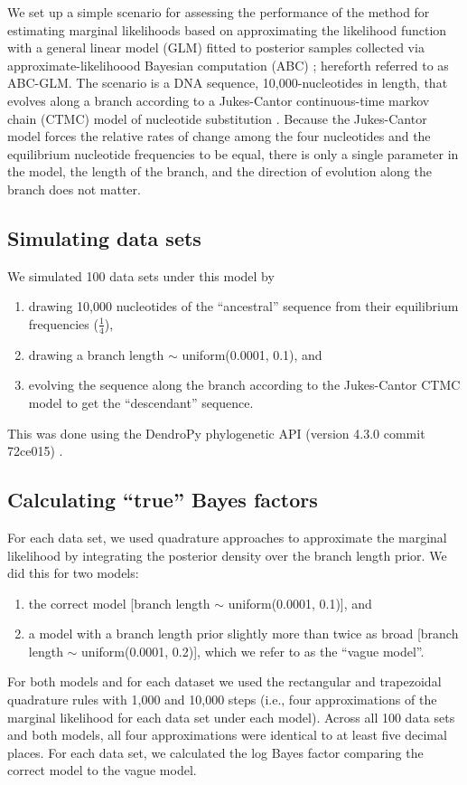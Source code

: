We set up a simple scenario for assessing the performance of the method for
estimating marginal likelihoods based on approximating the likelihood function
with a general linear model (GLM) fitted to posterior samples collected via
approximate-likelihoood Bayesian computation (ABC) \citep{Leuenberger2010};
hereforth referred to as ABC-GLM.
The scenario is a DNA sequence, 10,000-nucleotides in length, that evolves
along a branch according to a Jukes-Cantor continuous-time markov chain (CTMC)
model of nucleotide substitution \citep{JC1969}.
Because the Jukes-Cantor model forces the relative rates of change among the
four nucleotides and the equilibrium nucleotide frequencies to be equal, there
is only a single parameter in the model, the length of the branch, and the
direction of evolution along the branch does not matter.

\subsection{Simulating data sets}
We simulated 100 data sets under this model by
\begin{enumerate}
    \item drawing 10,000 nucleotides of the ``ancestral'' sequence from their
        equilibrium frequencies ($\frac{1}{4}$), 
    \item drawing a branch length $\sim$ uniform(0.0001, 0.1), and
    \item evolving the sequence along the branch according to the Jukes-Cantor
        CTMC model to get the ``descendant'' sequence.
\end{enumerate}
This was done using the DendroPy phylogenetic API (version 4.3.0 commit
72ce015) \citep{Sukumaran2010}.

\subsection{Calculating ``true'' Bayes factors}
For each data set, we used quadrature approaches to approximate the marginal
likelihood by integrating the posterior density over the branch length prior.
We did this for two models:
\begin{enumerate}
    \item the correct model [branch length $\sim$ uniform(0.0001, 0.1)], and
    \item a model with a branch length prior slightly more than twice as broad
        [branch length $\sim$ uniform(0.0001, 0.2)], which we refer to as the
        ``vague model''.
\end{enumerate}
For both models and for each dataset we used the rectangular and trapezoidal
quadrature rules with 1,000 and 10,000 steps (i.e., four approximations of the
marginal likelihood for each data set under each model).
Across all 100 data sets and both models, all four approximations were
identical to at least five decimal places.
For each data set, we calculated the log Bayes factor comparing the correct
model to the vague model.

